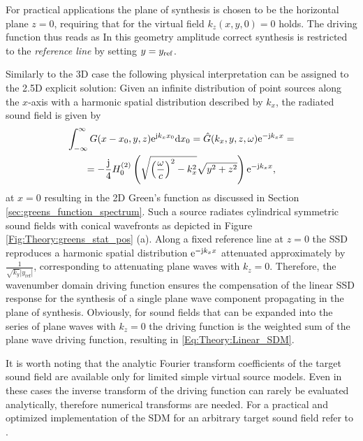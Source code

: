 For practical applications the plane of synthesis is chosen to be the horizontal plane $z=0$, requiring that for the virtual field $k_z(x,y,0) = 0$ holds.
The driving function thus reads as
In this geometry amplitude correct synthesis is restricted to the \emph{reference line} by setting $y = y_{\mathrm{ref}}$.

Similarly to the 3D case the following physical interpretation can be assigned to the 2.5D explicit solution:
Given an infinite distribution of point sources along the $x$-axis with a harmonic spatial distribution described by $k_x$, the radiated sound field is given by
\begin{multline}
\int_{-\infty}^{\infty} G(x - x_0,y,z) \mathrm{e}^{\mathrm{j} k_x x_0} \mathrm{d} x_0 = \hat{G}(k_x,y,z,\omega) \mathrm{e}^{-\mathrm{j} k_x x} = \\
=  -\frac{\mathrm{j}}{4} H_0^{(2)}\left( \sqrt{\left( \frac{\omega}{c} \right)^2-k_x^2} \sqrt{y^2+z^2} \right)  \mathrm{e}^{-\mathrm{j} k_x x},
\end{multline}
at $x=0$ resulting in the 2D Green's function as discussed in Section \ref{sec:greens_function_spectrum}.
Such a source radiates cylindrical symmetric sound fields with conical wavefronts as depicted in Figure \eqref{Fig:Theory:greens_stat_pos} (a). 
Along a fixed reference line at $z=0$ the SSD reproduces a harmonic spatial distribution $\mathrm{e}^{-\mathrm{j} k_x x}$ attenuated approximately by $\frac{1}{\sqrt{k_y}|y_{\mathrm{ref}}|}$, corresponding to attenuating plane waves with $k_z=0$.
Therefore, the wavenumber domain driving function ensures the compensation of the linear SSD response for the synthesis of a single plane wave component propagating in the plane of synthesis.
Obviously, for sound fields that can be expanded into the series of plane waves with $k_z=0$ the driving function is the weighted sum of the plane wave driving function, resulting in \eqref{Eq:Theory:Linear_SDM}.

It is worth noting that the analytic Fourier transform coefficients of the target sound field are available only for limited simple virtual source models. 
Even in these cases the inverse transform of the driving function can rarely be evaluated analytically, therefore numerical transforms are needed.
For a practical and optimized implementation of the SDM for an arbitrary target sound field refer to \cite{ahrens2013a:efficientSDM}.


